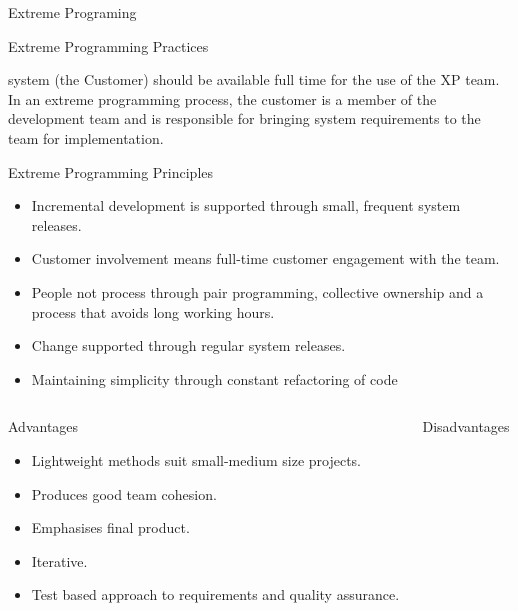 \documentclass[final,hyperref={pdfpagelabels=false}]{beamer}
\begin{document}
\begin{frame}{Extreme Programing}
\begin{block}{\large Extreme Programming Practices}
\begin{itemize}
            system (the Customer) should be available full time for the
            use of the XP team. In an extreme programming process,
            the customer is a member of the development team and is
            responsible for bringing system requirements to the team
            for implementation.
        \end{itemize}
    \end{block}  
    \vfill
     \begin{block}{\large Extreme Programming Principles}
        \centering
        \begin{itemize}
            \item Incremental development is supported through small,
            frequent system releases.
            \item Customer involvement means full-time customer
            engagement with the team.
            \item People not process through pair programming,
            collective ownership and a process that avoids long
            working hours.
            \item Change supported through regular system releases.
            \item Maintaining simplicity through constant refactoring of
            code
        \end{itemize}
    \end{block}  
    \begin{columns}[t]
      \begin{column}{.48\linewidth}
        \begin{block}{Advantages}
          \begin{itemize}
          \item Lightweight methods suit small-medium size projects.
          \item Produces good team cohesion.
          \item Emphasises final product.
          \item Iterative.
          \item Test based approach to requirements and quality
                assurance.
          \end{itemize}
        \end{block}
        \vfill
      \end{column}
      \begin{column}{.48\linewidth}
        \begin{block}{Disadvantages}
          \begin{itemize}

\end{itemize}
\end{block}
\end{column}
\end{columns}
\end{frame}
\end{document}
